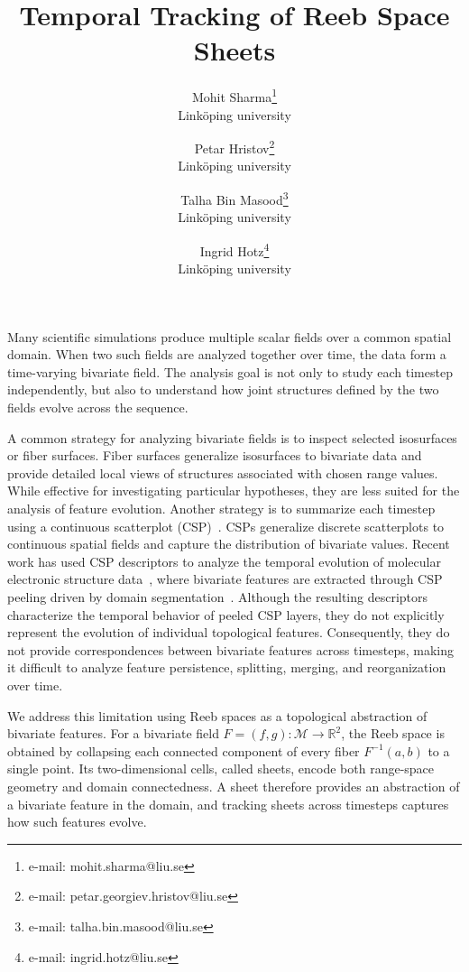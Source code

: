 \documentclass[review]{vgtc}                          %
\title{Temporal Tracking of Reeb Space Sheets}
\author{Mohit Sharma\thanks{e-mail: mohit.sharma@liu.se}\\ %
        \scriptsize Link\"oping university %
\and Petar Hristov\thanks{e-mail: petar.georgiev.hristov@liu.se}\\ %
        \scriptsize Link\"oping university %
\and Talha Bin Masood\thanks{e-mail: talha.bin.masood@liu.se}\\ %
        \scriptsize Link\"oping university %
\and Ingrid Hotz\thanks{e-mail: ingrid.hotz@liu.se}\\ %
        \scriptsize Link\"oping university %
}
\newcommand{\R}{\mathbb{R}}
\newcommand{\Domain}{\mathcal{M}}
\begin{document}


\maketitle
Many scientific simulations produce multiple scalar fields over a common spatial domain. When two such fields are analyzed together over time, the data form a time-varying bivariate field. The analysis goal is not only to study each timestep independently, but also to understand how joint structures defined by the two fields evolve across the sequence.

A common strategy for analyzing bivariate fields is to inspect selected isosurfaces or fiber surfaces. Fiber surfaces generalize isosurfaces to bivariate data and provide detailed local views of structures associated with chosen range values. While effective for investigating particular hypotheses, they are less suited for the analysis of feature evolution. Another strategy is to summarize each timestep using a continuous scatterplot (CSP)~\cite{Bachthaler2008}. CSPs generalize discrete scatterplots to continuous spatial fields and capture the distribution of bivariate values. Recent work has used CSP descriptors to analyze the temporal evolution of molecular electronic structure data~\cite{Sharma2025}, where bivariate features are extracted through CSP peeling driven by domain segmentation~\cite{Sharma2021}. Although the resulting descriptors characterize the temporal behavior of peeled CSP layers, they do not explicitly represent the evolution of individual topological features. Consequently, they do not provide correspondences between bivariate features across timesteps, making it difficult to analyze feature persistence, splitting, merging, and reorganization over time.

We address this limitation using Reeb spaces as a topological abstraction of bivariate features. For a bivariate field $F=(f,g):\Domain\rightarrow\R^2$, the Reeb space is obtained by collapsing each connected component of every fiber $F^{-1}(a,b)$ to a single point. Its two-dimensional cells, called sheets, encode both range-space geometry and domain connectedness. A sheet therefore provides an abstraction of a bivariate feature in the domain, and tracking sheets across timesteps captures how such features evolve.
\end{document}
